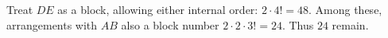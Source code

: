 Treat $ DE $ as a block, allowing either internal order: $ 2\cdot4!=48 $. Among these, arrangements with $ AB $ also a block number $ 2\cdot2\cdot3!=24 $. Thus $\boxed{24}$ remain.
